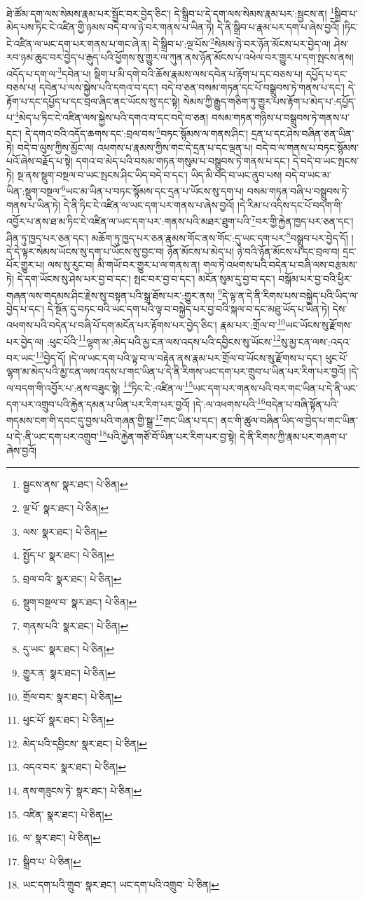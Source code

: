 ཐེ་ཚོམ་དག་ལས་སེམས་རྣམ་པར་སྦྱོང་བར་བྱེད་ཅིང་། དེ་སྒྲིབ་པ་དེ་དག་ལས་སེམས་རྣམ་པར་:སྦྱངས་ན། \footnote{སྦྱངས་ནས་  སྣར་ཐང་།  པེ་ཅིན། }སྒྲིབ་པ་མེད་པས་ཏིང་ངེ་འཛིན་གྱི་ཉམས་བདེ་བ་ལ་ཉེ་བར་གནས་པ་ཡིན་ཏེ། དེ་ནི་སྒྲིབ་པ་རྣམ་པར་དག་པ་ཞེས་བྱའོ། །ཏིང་ངེ་འཛིན་ལ་ཡང་དག་པར་གནས་པ་གང་ཞེ་ན། དེ་སྒྲིབ་པ་:ལྔ་པོས་\footnote{ལྔ་པོ་  སྣར་ཐང་།  པེ་ཅིན། }སེམས་ཉེ་བར་ཉོན་མོངས་པར་བྱེད་ལ། ཤེས་རབ་ཉམ་ཆུང་བར་བྱེད་པ་རྒུད་པའི་ཕྱོགས་སུ་གྱུར་ལ་ཀུན་ནས་ཉོན་མོངས་པ་འཕེལ་བར་གྱུར་པ་དག་སྤངས་ནས། འདོད་པ་དག་ལ་\footnote{ལས་  སྣར་ཐང་།  པེ་ཅིན། }དབེན་པ། སྡིག་པ་མི་དགེ་བའི་ཆོས་རྣམས་ལས་དབེན་པ་རྟོག་པ་དང་བཅས་པ། དཔྱོད་པ་དང་བཅས་པ། དབེན་པ་ལས་སྐྱེས་པའི་དགའ་བ་དང་། བདེ་བ་ཅན་བསམ་གཏན་དང་པོ་བསྒྲུབས་ཏེ་གནས་པ་དང་། དེ་རྟོག་པ་དང་དཔྱོད་པ་དང་བྲལ་ཞིང་ནང་ཡོངས་སུ་དང་སྟེ། སེམས་ཀྱི་རྒྱུད་གཅིག་ཏུ་གྱུར་པས་རྟོག་པ་མེད་པ་:དཔྱོད་པ་\footnote{སྤྱོད་པ་  སྣར་ཐང་།  པེ་ཅིན། }མེད་པ་ཏིང་ངེ་འཛིན་ལས་སྐྱེས་པའི་དགའ་བ་དང་བདེ་བ་ཅན། བསམ་གཏན་གཉིས་པ་བསྒྲུབས་ཏེ་གནས་པ་དང་། དེ་དགའ་བའི་འདོད་ཆགས་དང་:བྲལ་བས་\footnote{བྲལ་བའི་  སྣར་ཐང་།  པེ་ཅིན། }བཏང་སྙོམས་ལ་གནས་ཤིང་། དྲན་པ་དང་ཤེས་བཞིན་ཅན་ཡིན་ཏེ། བདེ་བ་ལུས་ཀྱིས་མྱོང་ལ། འཕགས་པ་རྣམས་ཀྱིས་གང་དེ་དྲན་པ་དང་ལྡན་པ། བདེ་བ་ལ་གནས་པ་བཏང་སྙོམས་པའོ་ཞེས་བརྗོད་པ་སྟེ། དགའ་བ་མེད་པའི་བསམ་གཏན་གསུམ་པ་བསྒྲུབས་ཏེ་གནས་པ་དང་། དེ་བདེ་བ་ཡང་སྤངས་ཏེ། སྔ་ནས་སྡུག་བསྔལ་བ་ཡང་སྤངས་ཤིང་ཡིད་བདེ་བ་དང་། ཡིད་མི་བདེ་བ་ཡང་ནུབ་པས། བདེ་བ་ཡང་མ་ཡིན་:སྡུག་བསྔལ་\footnote{སྡུག་བསྔལ་བ་  སྣར་ཐང་།  པེ་ཅིན། }ཡང་མ་ཡིན་པ་བཏང་སྙོམས་དང་དྲན་པ་ཡོངས་སུ་དག་པ། བསམ་གཏན་བཞི་པ་བསྒྲུབས་ཏེ་གནས་པ་ཡིན་ཏེ། དེ་ནི་ཏིང་ངེ་འཛིན་ལ་ཡང་དག་པར་གནས་པ་ཞེས་བྱའོ། །དེ་རིམ་པ་འདིས་དང་པོ་བདག་གི་འབྱོར་པ་ནས་ཐ་མ་ཏིང་ངེ་འཛིན་ལ་ཡང་དག་པར་:གནས་པའི་མཐར་ཐུག་པའི་\footnote{གནས་པའི་  སྣར་ཐང་།  པེ་ཅིན། }བར་གྱི་རྐྱེན་ཁྱད་པར་ཅན་དང་། ཤིན་ཏུ་ཁྱད་པར་ཅན་དང་། མཆོག་ཏུ་ཁྱད་པར་ཅན་རྣམས་གོང་ནས་གོང་:དུ་ཡང་དག་པར་\footnote{དུ་ཡང་  སྣར་ཐང་།  པེ་ཅིན། }བསྒྲུབ་པར་བྱེད་དོ། །དེ་དེ་ལྟར་སེམས་ཡོངས་སུ་དག་པ་ཡོངས་སུ་བྱང་བ། ཉོན་མོངས་པ་མེད་པ། ཉེ་བའི་ཉོན་མོངས་པ་དང་བྲལ་བ། དྲང་པོར་གྱུར་པ། ལས་སུ་རུང་བ། མི་གཡོ་བར་གྱུར་པ་ལ་གནས་ན། གལ་ཏེ་འཕགས་པའི་བདེན་པ་བཞི་ལས་བརྩམས་ཏེ། དེ་དག་ཡོངས་སུ་ཤེས་པར་བྱ་བ་དང་། སྤང་བར་བྱ་བ་དང་། མངོན་སུམ་དུ་བྱ་བ་དང་། བསྒོམ་པར་བྱ་བའི་ཕྱིར་གཞན་ལས་གདམས་ཤིང་རྗེས་སུ་བསྟན་པའི་སྒྲ་ཐོས་པར་:གྱུར་ནས། \footnote{གྱུར་ན་  སྣར་ཐང་།  པེ་ཅིན། }དེ་ལྟ་ན་དེ་ནི་རིགས་པས་བསྐྱེད་པའི་ཡིད་ལ་བྱེད་པ་དང་། དེ་སྔོན་དུ་བཏང་བའི་ཡང་དག་པའི་ལྟ་བ་བསྐྱེད་པར་བྱ་བའི་སྐལ་བ་དང་མཐུ་ཡོད་པ་ཡིན་ཏེ། དེས་འཕགས་པའི་བདེན་པ་བཞི་པོ་དག་མངོན་པར་རྟོགས་པར་བྱེད་ཅིང་། རྣམ་པར་:གྲོལ་བ་\footnote{གྲོལ་བར་  སྣར་ཐང་།  པེ་ཅིན། }ཡང་ཡོངས་སུ་རྫོགས་པར་བྱེད་ལ། :ཕུང་པོའི་\footnote{ཕུང་པོ་  སྣར་ཐང་།  པེ་ཅིན། }ལྷག་མ་:མེད་པའི་མྱ་ངན་ལས་འདས་པའི་དབྱིངས་སུ་ཡོངས་\footnote{མེད་པའི་དབྱིངས་  སྣར་ཐང་།  པེ་ཅིན། }སུ་མྱ་ངན་ལས་:འདའ་བར་ཡང་\footnote{འདའ་བར་  སྣར་ཐང་།  པེ་ཅིན། }བྱེད་དོ། །དེ་ལ་ཡང་དག་པའི་ལྟ་བ་ལ་བརྟེན་ནས་རྣམ་པར་གྲོལ་བ་ཡོངས་སུ་རྫོགས་པ་དང་། ཕུང་པོ་ལྷག་མ་མེད་པའི་མྱ་ངན་ལས་འདས་པ་གང་ཡིན་པ་དེ་ནི་རིགས་ཡང་དག་པར་གྲུབ་པ་ཡིན་པར་རིག་པར་བྱའོ། །དེ་ལ་བདག་གི་འབྱོར་པ་:ནས་བཟུང་སྟེ། \footnote{ནས་གཟུངས་ཏེ་  སྣར་ཐང་།  པེ་ཅིན། }ཏིང་ངེ་:འཛིན་ལ་\footnote{འཛིན་  སྣར་ཐང་།  པེ་ཅིན། }ཡང་དག་པར་གནས་པའི་བར་གང་ཡིན་པ་དེ་ནི་ཡང་དག་པར་འགྲུབ་པའི་རྐྱེན་དམན་པ་ཡིན་པར་རིག་པར་བྱའོ། །དེ་:ལ་འཕགས་པའི་\footnote{ལ་  སྣར་ཐང་།  པེ་ཅིན། }བདེན་པ་བཞི་སྟོན་པའི་གདམས་ངག་གི་དབང་དུ་བྱས་པའི་གཞན་གྱི་སྒྲ་\footnote{སྒྲིབ་པ་  པེ་ཅིན། }གང་ཡིན་པ་དང་། ནང་གི་ཚུལ་བཞིན་ཡིད་ལ་བྱེད་པ་གང་ཡིན་པ་དེ་:ནི་ཡང་དག་པར་འགྲུབ་\footnote{ཡང་དག་པའི་གྲུབ་  སྣར་ཐང་། ཡང་དག་པའི་འགྲུབ་  པེ་ཅིན། }པའི་རྐྱེན་གཙོ་བོ་ཡིན་པར་རིག་པར་བྱ་སྟེ། དེ་ནི་རིགས་ཀྱི་རྣམ་པར་གཞག་པ་ཞེས་བྱའོ། 